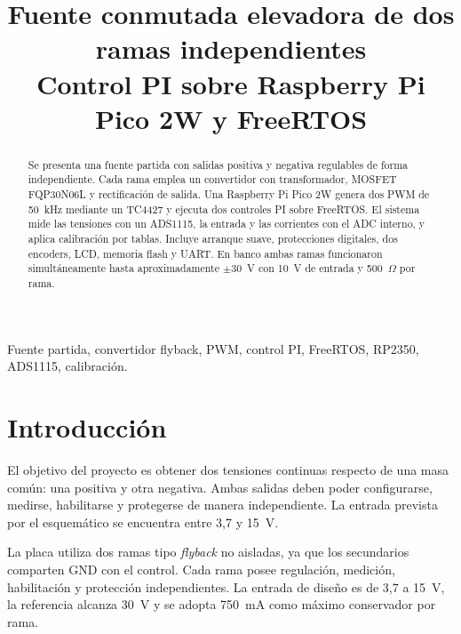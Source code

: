 \documentclass[conference]{IEEEtran}
\begin{document}
\title{Fuente conmutada elevadora de dos ramas independientes\\
\large Control PI sobre Raspberry Pi Pico 2W y FreeRTOS}

\author{
}

\maketitle

\begin{abstract}
Se presenta una fuente partida con salidas positiva y negativa regulables de forma independiente. Cada rama emplea un convertidor con transformador, MOSFET FQP30N06L y rectificación de salida. Una Raspberry Pi Pico 2W genera dos PWM de 50~kHz mediante un TC4427 y ejecuta dos controles PI sobre FreeRTOS. El sistema mide las tensiones con un ADS1115, la entrada y las corrientes con el ADC interno, y aplica calibración por tablas. Incluye arranque suave, protecciones digitales, dos encoders, LCD, memoria flash y UART. En banco ambas ramas funcionaron simultáneamente hasta aproximadamente $\pm30$~V con 10~V de entrada y 500~$\Omega$ por rama.
\end{abstract}

\begin{IEEEkeywords}
Fuente partida, convertidor flyback, PWM, control PI, FreeRTOS, RP2350, ADS1115, calibración.
\end{IEEEkeywords}

\newpage
{\small\setcounter{tocdepth}{1}\tableofcontents}
\clearpage

\section{Introducción}

El objetivo del proyecto es obtener dos tensiones continuas respecto de una masa común: una positiva y otra negativa. Ambas salidas deben poder configurarse, medirse, habilitarse y protegerse de manera independiente. La entrada prevista por el esquemático se encuentra entre 3,7 y 15~V.

La placa utiliza dos ramas tipo \textit{flyback} no aisladas, ya que los secundarios comparten GND con el control. Cada rama posee regulación, medición, habilitación y protección independientes. La entrada de diseño es de 3,7 a 15~V, la referencia alcanza 30~V y se adopta 750~mA como máximo conservador por rama.
\end{document}
